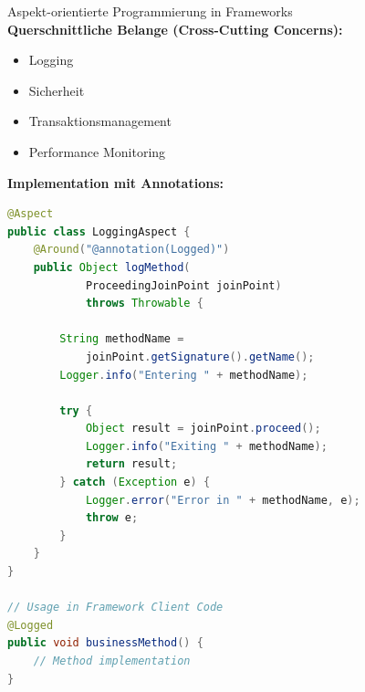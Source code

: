 \begin{concept}{Aspekt-orientierte Programmierung in Frameworks}\\
\textbf{Querschnittliche Belange (Cross-Cutting Concerns):}
\begin{itemize}
    \item Logging
    \item Sicherheit
    \item Transaktionsmanagement
    \item Performance Monitoring
\end{itemize}

\textbf{Implementation mit Annotations:}
\begin{lstlisting}[language=Java, style=base]
@Aspect
public class LoggingAspect {
    @Around("@annotation(Logged)")
    public Object logMethod(
            ProceedingJoinPoint joinPoint) 
            throws Throwable {
        
        String methodName = 
            joinPoint.getSignature().getName();
        Logger.info("Entering " + methodName);
        
        try {
            Object result = joinPoint.proceed();
            Logger.info("Exiting " + methodName);
            return result;
        } catch (Exception e) {
            Logger.error("Error in " + methodName, e);
            throw e;
        }
    }
}

// Usage in Framework Client Code
@Logged
public void businessMethod() {
    // Method implementation
}
\end{lstlisting}
\end{concept}

